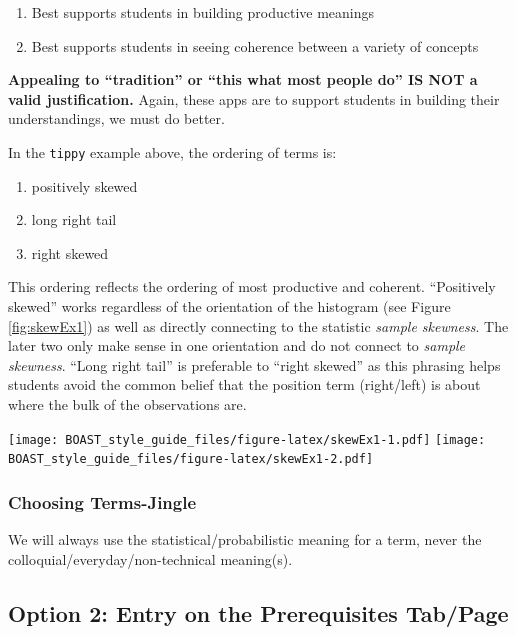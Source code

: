 \documentclass[
]{book}
\providecommand{\tightlist}{%
  \setlength{\itemsep}{0pt}\setlength{\parskip}{0pt}}
\begin{document}
\begin{enumerate}
\def\labelenumi{\arabic{enumi}.}
\tightlist
\item
  Best supports students in building productive meanings
\item
  Best supports students in seeing coherence between a variety of concepts
\end{enumerate}

\textbf{Appealing to ``tradition'' or ``this what most people do'' IS NOT a valid justification.} Again, these apps are to support students in building their understandings, we must do better.

In the \texttt{tippy} example above, the ordering of terms is:

\begin{enumerate}
\def\labelenumi{\arabic{enumi}.}
\tightlist
\item
  positively skewed
\item
  long right tail
\item
  right skewed
\end{enumerate}

This ordering reflects the ordering of most productive and coherent. ``Positively skewed'' works regardless of the orientation of the histogram (see Figure \ref{fig:skewEx1}) as well as directly connecting to the statistic \emph{sample skewness}. The later two only make sense in one orientation and do not connect to \emph{sample skewness}. ``Long right tail'' is preferable to ``right skewed'' as this phrasing helps students avoid the common belief that the position term (right/left) is about where the bulk of the observations are.

\texttt{[image: BOAST\_style\_guide\_files/figure-latex/skewEx1-1.pdf]} \texttt{[image: BOAST\_style\_guide\_files/figure-latex/skewEx1-2.pdf]}

\hypertarget{choosing-terms-jingle}{%
\subsubsection{Choosing Terms-Jingle}\label{choosing-terms-jingle}}

We will always use the statistical/probabilistic meaning for a term, never the colloquial/everyday/non-technical meaning(s).

\hypertarget{option-2-entry-on-the-prerequisites-tabpage}{%
\subsection{Option 2: Entry on the Prerequisites Tab/Page}\label{option-2-entry-on-the-prerequisites-tabpage}}
\end{document}

